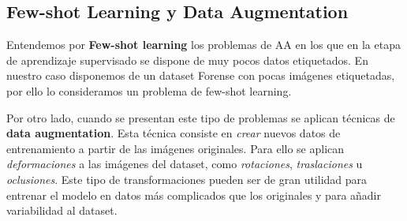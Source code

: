     \subsection{Few-shot Learning y Data Augmentation} \label{sub:data_augmentation}
        \noindent Entendemos por \textbf{Few-shot learning} los problemas de AA en los que en la etapa de aprendizaje supervisado se dispone de muy pocos datos etiquetados. En nuestro caso disponemos de un dataset Forense con pocas imágenes etiquetadas, por ello lo consideramos un problema de few-shot learning.

        \medskip

        \noindent Por otro lado, cuando se presentan este tipo de problemas se aplican técnicas de \textbf{data augmentation}. Esta técnica consiste en \textit{crear} nuevos datos de entrenamiento a partir de las imágenes originales. Para ello se aplican \textit{deformaciones} a las imágenes del dataset, como \textit{rotaciones}, \textit{traslaciones} u \textit{oclusiones}. Este tipo de transformaciones pueden ser de gran utilidad para entrenar el modelo en datos más complicados que los originales y para añadir variabilidad al dataset.
        
\endinput

